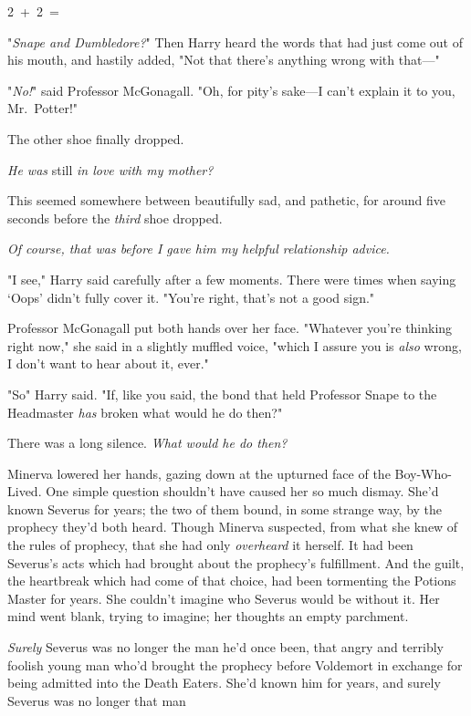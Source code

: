 2~+~2~=~{\el}

"\emph{Snape and Dumbledore?}" Then Harry heard the words that had just come
out of his mouth, and hastily added, "Not that there's anything wrong with
that\mbox{---}"

"\emph{No!}" said Professor McGonagall. "Oh, for pity's sake---I can't explain
it to you, Mr.~Potter!"

The other shoe finally dropped.

\emph{He was} still \emph{in love with my mother?}

This seemed somewhere between beautifully sad, and pathetic, for around five
seconds before the \emph{third} shoe dropped.

\emph{Of course, that was before I gave him my helpful relationship advice.}

"I see," Harry said carefully after a few moments. There were times when saying
`Oops' didn't fully cover it. "You're right, that's not a good sign."

Professor McGonagall put both hands over her face. "Whatever you're thinking
right now," she said in a slightly muffled voice, "which I assure you is
\emph{also} wrong, I don't want to hear about it, ever."

"So{\el}" Harry said. "If, like you said, the bond that held Professor Snape
to the Headmaster \emph{has} broken{\el} what would he do then?"

There was a long silence.
\sbreak
\emph{What would he do then?}

Minerva lowered her hands, gazing down at the upturned face of the
Boy-Who-Lived. One simple question shouldn't have caused her so much dismay.
She'd known Severus for years; the two of them bound, in some strange way, by
the prophecy they'd both heard. Though Minerva suspected, from what she knew of
the rules of prophecy, that she had only \emph{overheard} it herself. It had
been Severus's acts which had brought about the prophecy's fulfillment. And the
guilt, the heartbreak which had come of that choice, had been tormenting the
Potions Master for years. She couldn't imagine who Severus would be without it.
Her mind went blank, trying to imagine; her thoughts an empty parchment.

\emph{Surely} Severus was no longer the man he'd once been, that angry and
terribly foolish young man who'd brought the prophecy before Voldemort in
exchange for being admitted into the Death Eaters. She'd known him for years,
and surely Severus was no longer that man{\el}

